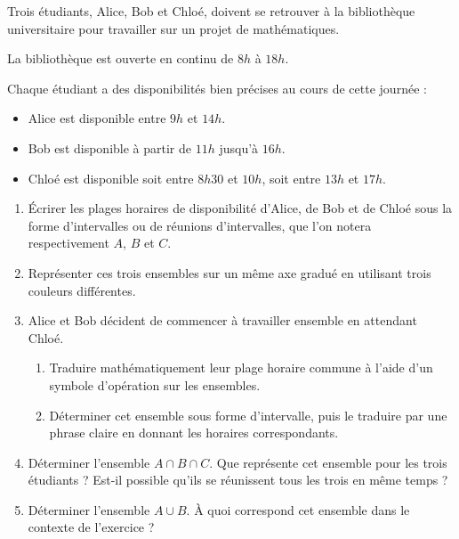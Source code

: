 \begin{exo}{}
	Trois étudiants, Alice, Bob et Chloé, doivent se retrouver à la bibliothèque universitaire pour travailler sur un projet de mathématiques.

	La bibliothèque est ouverte en continu de $8h$ à $18h$.

	Chaque étudiant a des disponibilités bien précises au cours de cette journée :
	\begin{itemize}
		\item Alice est disponible entre $9h$ et $14h$.
		\item Bob est disponible à partir de $11h$ jusqu'à $16h$.
		\item Chloé est disponible soit entre $8h30$ et $10h$, soit entre $13h$ et $17h$.
	\end{itemize}
	\begin{enumerate}
		\item Écrirer les plages horaires de disponibilité d'Alice, de Bob et de Chloé sous la forme d'intervalles ou de réunions d'intervalles, que l'on notera respectivement $A$, $B$ et $C$.
		\item Représenter ces trois ensembles sur un même axe gradué en utilisant trois couleurs différentes.
		\item Alice et Bob décident de commencer à travailler ensemble en attendant Chloé.
		      \begin{enumerate}
			      \item Traduire mathématiquement leur plage horaire commune à l'aide d'un symbole d'opération sur les ensembles.
			      \item Déterminer cet ensemble sous forme d'intervalle, puis le traduire par une phrase claire en donnant les horaires correspondants.
		      \end{enumerate}
		\item Déterminer l'ensemble $A \cap B \cap C$. Que représente cet ensemble pour les trois étudiants ? Est-il possible qu'ils se réunissent tous les trois en même temps ?
		\item Déterminer l'ensemble $A \cup B$. À quoi correspond cet ensemble dans le contexte de l'exercice ?
	\end{enumerate}
\end{exo}
